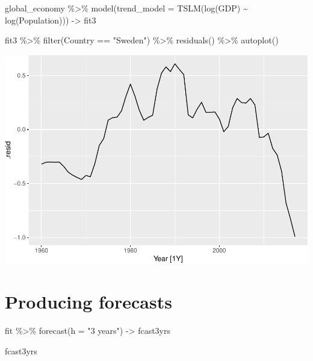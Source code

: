 \documentclass[
]{book}
\newenvironment{Shaded}{\begin{snugshade}}{\end{snugshade}}
\newcommand{\AttributeTok}[1]{\textcolor[rgb]{0.77,0.63,0.00}{#1}}
\newcommand{\FunctionTok}[1]{\textcolor[rgb]{0.00,0.00,0.00}{#1}}
\newcommand{\NormalTok}[1]{#1}
\newcommand{\OtherTok}[1]{\textcolor[rgb]{0.56,0.35,0.01}{#1}}
\newcommand{\SpecialCharTok}[1]{\textcolor[rgb]{0.00,0.00,0.00}{#1}}
\newcommand{\StringTok}[1]{\textcolor[rgb]{0.31,0.60,0.02}{#1}}
\begin{document}
\begin{Shaded}
\begin{Highlighting}[]
\NormalTok{global\_economy }\SpecialCharTok{\%\textgreater{}\%} \FunctionTok{model}\NormalTok{(}\AttributeTok{trend\_model =} \FunctionTok{TSLM}\NormalTok{(}\FunctionTok{log}\NormalTok{(GDP) }\SpecialCharTok{\textasciitilde{}} \FunctionTok{log}\NormalTok{(Population))) }\OtherTok{{-}\textgreater{}}\NormalTok{ fit3}

\NormalTok{fit3 }\SpecialCharTok{\%\textgreater{}\%} \FunctionTok{filter}\NormalTok{(Country }\SpecialCharTok{==} \StringTok{"Sweden"}\NormalTok{) }\SpecialCharTok{\%\textgreater{}\%} \FunctionTok{residuals}\NormalTok{() }\SpecialCharTok{\%\textgreater{}\%} \FunctionTok{autoplot}\NormalTok{()}
\end{Highlighting}
\end{Shaded}

\includegraphics{graphics/unnamed-chunk-32-1.pdf}

\hypertarget{producing-forecasts}{%
\section{Producing forecasts}\label{producing-forecasts}}

\begin{Shaded}
\begin{Highlighting}[]
\NormalTok{fit }\SpecialCharTok{\%\textgreater{}\%} \FunctionTok{forecast}\NormalTok{(}\AttributeTok{h =} \StringTok{"3 years"}\NormalTok{) }\OtherTok{{-}\textgreater{}}\NormalTok{ fcast3yrs}

\NormalTok{fcast3yrs}
\end{Highlighting}
\end{Shaded}
\end{document}
